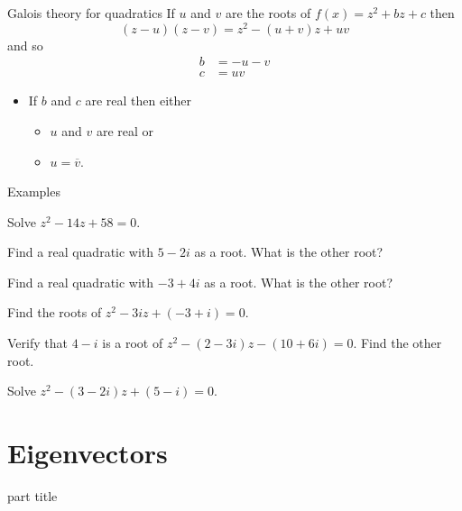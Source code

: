 \documentclass{beamer}
\begin{document}
\begin{frame}{Galois theory for quadratics}
If $u$ and $v$ are the roots of $f(x) = z^2 + bz+c$ then
\begin{equation*}
(z-u)(z-v) = z^2 - (u+v)z + uv
\end{equation*}
and so
\begin{align*}
b & = -u-v\\
c & = uv
\end{align*}
\begin{itemize}
	\item If $b$ and $c$ are real then either
	\begin{itemize}
		\item $u$ and $v$ are real or
		\item $u = \overline{v}$.
	\end{itemize}
\end{itemize}
\end{frame}

\begin{frame}{Examples}
\begin{example}
Solve $z^2-14z+58 = 0$.
\end{example}
\begin{example}
Find a real quadratic with $5-2i$ as a root. What is the other root?
\end{example}
\begin{example}
Find a real quadratic with $-3+4i$ as a root. What is the other root?
\end{example}
\end{frame}

\begin{frame}
\begin{example}
Find the roots of $z^2-3iz+(-3+i) = 0$.
\end{example}
\begin{example}
Verify that $4-i$ is a root of $z^2 - (2-3i)z-(10+6i) = 0$. Find the other root.
\end{example}
\begin{example}
Solve $z^2-(3-2i)z + (5-i) = 0$.
\end{example}
\end{frame}

\section{Eigenvectors}

\begin{frame}
\begin{beamercolorbox}[sep=12pt,center]{part title}
\insertsection\par
\end{beamercolorbox}
\end{frame}
\end{document}
